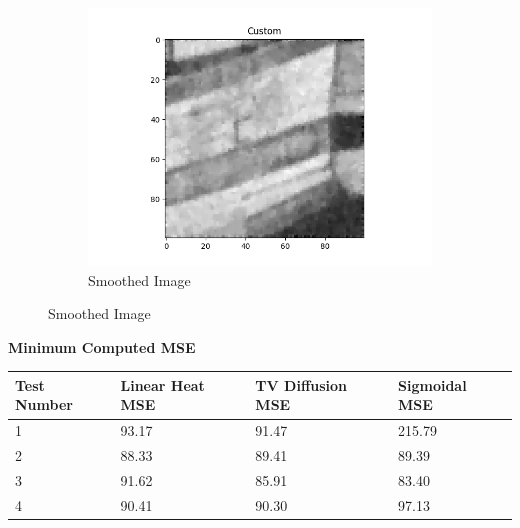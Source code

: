 \documentclass{article}
\begin{document}
\begin{center}
\begin{figure}[!htb]
\begin{center}
        \hfill
        \begin{subfigure}[b]{0.5\textwidth}
          \includegraphics[width=\textwidth]{../generated_images/Custom_test4.png}
          \caption{Smoothed Image}
        \end{subfigure}
      \end{center}
    \end{figure}
  \end{center}

  \newpage
  \noindent
  \textbf{Minimum Computed MSE}
  \begin{table}[h]
    \begin{tabular}{|l|l|ll|lllll|}
    \hline
    Test Number & Linear Heat MSE & \multicolumn{2}{l|}{TV Diffusion MSE} & \multicolumn{5}{l|}{Sigmoidal MSE}   \\ \hline
    1           &  93.17          & \multicolumn{2}{l|}{91.47}            & \multicolumn{5}{l|}{215.79}          \\ \hline
    2           &  88.33          & \multicolumn{2}{l|}{89.41}            & \multicolumn{5}{l|}{89.39}           \\ \hline
    3           &  91.62          & \multicolumn{2}{l|}{85.91}            & \multicolumn{5}{l|}{83.40}           \\ \hline
    4           &  90.41          & \multicolumn{2}{l|}{90.30}            & \multicolumn{5}{l|}{97.13}           \\ \hline
    \end{tabular}
    \end{table}
\end{document}
